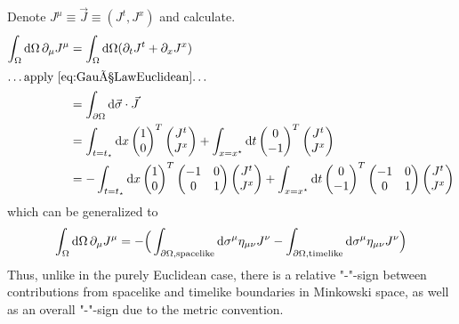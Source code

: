 Denote $J^\mu\equiv\vec{J}\equiv(J^t,J^x)$ and calculate.
\begin{subequations}
    \begin{align}
        \int_\Omega\text{d}\Omega\,\partial_\mu J^\mu&=\int_\Omega\text{d}\Omega(\partial_tJ^t+\partial_xJ^x)\\
        \intertext{\dots apply \ref{eq:GaußLawEuclidean}\dots}
        &=\int_{\partial\Omega}\text{d}\vec{\sigma}\cdot \vec{J}\\
        &=\int_{t=t_\star}\text{d} x\begin{pmatrix}
            1\\0
        \end{pmatrix}^T\begin{pmatrix}
            J^t\\J^x
        \end{pmatrix}
        +\int_{x=x^\star}\text{d} t\begin{pmatrix}
            0\\-1
        \end{pmatrix}^T\begin{pmatrix}
            J^t\\J^x
        \end{pmatrix}\\
        &=-\int_{t=t_\star}\text{d} x\begin{pmatrix}
            1\\0
        \end{pmatrix}^T\begin{pmatrix}
        -1&0\\0&1
        \end{pmatrix}\begin{pmatrix}
            J^t\\J^x
        \end{pmatrix}
        +\int_{x=x^\star}\text{d} t\begin{pmatrix}
            0\\-1
        \end{pmatrix}^T\begin{pmatrix}
            -1&0\\0&1
        \end{pmatrix}\begin{pmatrix}
            J^t\\J^x
        \end{pmatrix}
    \end{align}
\end{subequations}
which can be generalized to
\begin{equation}
    \int_\Omega\text{d}\Omega\,\partial_\mu J^\mu=-\Big(\int_{\partial\Omega,\text{spacelike}}\text{d}\sigma^\mu\eta_{\mu\nu}J^\nu-\int_{\partial\Omega,\text{timelike}}\text{d}\sigma^\mu\eta_{\mu\nu}J^\nu\Big)
\end{equation}
Thus, unlike in the purely Euclidean case, there is a relative "-"-sign between contributions from spacelike and timelike boundaries in Minkowski space, as well as an overall "-"-sign due to the metric convention.